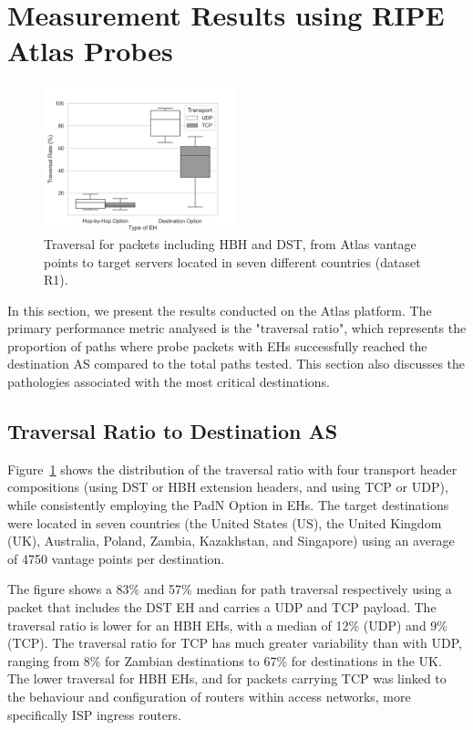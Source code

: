 \documentclass[conference]{IEEEtran}
\begin{document}
\section{Measurement Results using RIPE Atlas Probes} 
\label{sec:ripe-results}

\begin{figure}[t]
\centering
  \includegraphics[width=0.5\textwidth]{all_traversal.png}
  \caption{Traversal for packets including HBH and DST, from Atlas vantage points to target servers located in seven different countries (dataset R1).}
  \label{fig:countrybox}
\end{figure}

In this section, we present the results conducted on the Atlas platform. 
The primary performance metric analysed is the "traversal ratio",
which represents the proportion of paths where probe packets with EHs
successfully reached the destination AS compared to the total paths tested.
This section also discusses the pathologies associated with the most
critical destinations.

\subsection{Traversal Ratio to Destination AS}


Figure~\ref{fig:countrybox} shows the distribution of the traversal ratio with
four transport header compositions (using DST or HBH extension headers, and
using TCP or UDP), while consistently employing the PadN Option in EHs.  The target
destinations were located in seven countries (the United States (US), the
United Kingdom (UK), Australia, Poland, Zambia, Kazakhstan, and Singapore) using
an average of 4750 vantage points per destination.

The figure shows a 83\% and 57\% median for path traversal 
respectively using a packet that includes the
DST EH and carries a UDP and TCP payload.  The traversal ratio is lower
for an HBH EHs, with a median of 12\% (UDP) and 9\% (TCP). The traversal ratio
 for TCP has much greater variability than with
UDP, ranging from 8\% for Zambian destinations to 67\% for destinations in the
UK. The lower traversal for HBH EHs, and for packets carrying TCP
was  linked to the
behaviour and configuration of routers within access networks, more
specifically ISP ingress routers.
\end{document}
